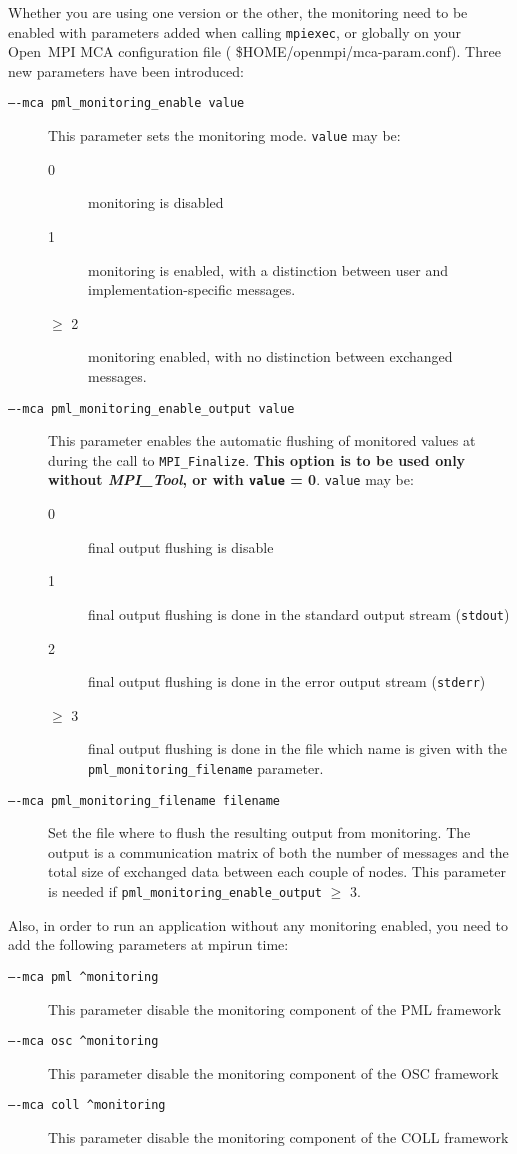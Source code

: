 \documentclass[notitlepage]{article}
\newcommand{\mpit}[1]{\textit{MPI\_Tool#1}}
\begin{document}
Whether you are using one version or the other, the monitoring need to
be enabled with parameters added when calling \texttt{mpiexec}, or globally
on your Open~MPI MCA configuration file ( \${HOME}/openmpi/mca-param.conf).
Three new parameters have been introduced:
\begin{description}
\item [\texttt{----mca pml\_monitoring\_enable value}] This parameter
  sets the monitoring mode. \texttt{value} may be:
  \begin{description}
  \item [0] monitoring is disabled
  \item [1] monitoring is enabled, with a distinction between user and
    implementation-specific messages.
  \item [$\ge$ 2] monitoring enabled, with no distinction between
    exchanged messages.
  \end{description}
\item [\texttt{----mca pml\_monitoring\_enable\_output value}] This
  parameter enables the automatic flushing of monitored values at
  during the call to \texttt{MPI\_Finalize}. {\bf This option is to be
    used only without \mpit{}, or with \texttt{value} =
    0}. \texttt{value} may be:
  \begin{description}
  \item [0] final output flushing is disable
  \item [1] final output flushing is done in the standard output stream (\texttt{stdout})
  \item [2] final output flushing is done in the error output stream (\texttt{stderr})
  \item [$\ge$ 3] final output flushing is done in the file which name
    is given with the \texttt{pml\_monitoring\_filename} parameter.
  \end{description}
\item [\texttt{----mca pml\_monitoring\_filename filename}] Set the
  file where to flush the resulting output from monitoring. The output
  is a communication matrix of both the number of messages and the
  total size of exchanged data between each couple of nodes. This
  parameter is needed if \texttt{pml\_monitoring\_enable\_output}
  $\ge$ 3.
\end{description}

Also, in order to run an application without any monitoring enabled,
you need to add the following parameters at mpirun time:
\begin{description}
\item [\texttt{----mca pml ^monitoring}] This parameter disable the
  monitoring component of the PML framework
\item [\texttt{----mca osc ^monitoring}] This parameter disable the
  monitoring component of the OSC framework
\item [\texttt{----mca coll ^monitoring}] This parameter disable the
    monitoring component of the COLL framework
\end{description}
\end{document}
